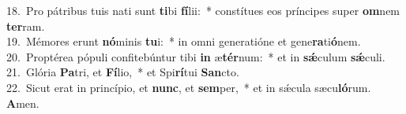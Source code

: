 {18.~}Pro pátribus tuis nati sunt \textbf{ti}bi \textbf{fí}lii:~* constítues eos príncipes super \textbf{om}nem \textbf{ter}ram.\\
{19.~}Mémores erunt \textbf{nó}minis \textbf{tu}i:~* in omni generatióne et gene\textbf{ra}ti\textbf{ó}nem.\\
{20.~}Proptérea pópuli confitebúntur tibi \textbf{in} æ\textbf{tér}num:~* et in \textbf{sǽ}culum \textbf{sǽ}culi.\\
{21.~}Glória \textbf{Pa}tri, et \textbf{Fí}lio,~* et Spi\textbf{rí}tui \textbf{San}cto.\\
{22.~}Sicut erat in princípio, et \textbf{nunc}, et \textbf{sem}per,~* et in sǽcula sæcu\textbf{ló}rum. \textbf{A}men.\\
